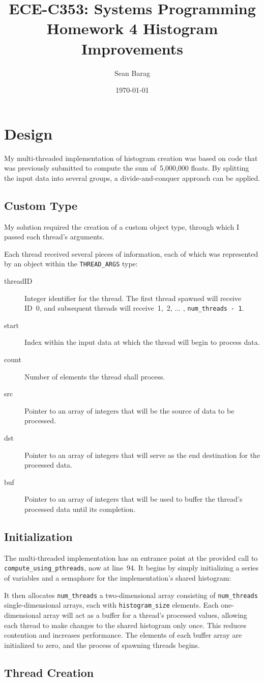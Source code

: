 \documentclass{article}
\title{ECE-C353: Systems Programming \\ Homework 4 Histogram Improvements}
\author{Sean Barag \\ \ttt{<sjb89@drexel.edu>}}
\date{\today}
\newcommand{\lst}[2]{
	\begin{center}
	\parbox{.6\textwidth}{
	}
	\end{center}
}
\newcommand{\ttt}[1]{\texttt{#1}}
\begin{document}
\maketitle
\section{Design}
My multi-threaded implementation of histogram creation was based on code that
was previously submitted to compute the sum of~5,000,000 floats.  By splitting
the input data into several groups, a divide-and-conquer approach can be
applied.

\subsection{Custom Type}
My solution required the creation of a custom object type, through which I passed each thread's arguments.
%
\lst{21}{31}
%
Each thread received several pieces of information, each of which was represented by an object within the \ttt{THREAD\_ARGS} type:

\begin{center}
\parbox{.85\textwidth}{
\begin{description}
	\item[threadID]{Integer identifier for the thread.  The first thread
	spawned will receive ID~0, and subsequent threads will
	receive~1,~2, $\ldots$ , \ttt{num\_threads - 1}.}
	\item[start]{Index within the input data at which the thread will begin to
	process data.}
	\item[count]{Number of elements the thread shall process.}
	\item[src]{Pointer to an array of integers that will be the source of data
	to be processed.}
	\item[dst]{Pointer to an array of integers that will serve as the end
	destination for the processed data.}
	\item[buf]{Pointer to an array of integers that will be used to buffer the
	thread's processed data until its completion.}
\end{description}
}
\end{center}

\subsection{Initialization}
The multi-threaded implementation has an entrance point at the provided call to
\ttt{compute\_using\_pthreads}, now at line~94.  It begins by simply
initializing a series of variables and a semaphore for the implementation's shared histogram:
%
\lst{134}{145}
%
It then allocates \ttt{num\_threads} a two-dimensional array consisting of
\ttt{num\_threads} single-dimensional arrays, each with
\ttt{histogram\_size} elements.  Each one-dimensional array will act as a
buffer for a thread's processed values, allowing each thread to make changes to
the shared histogram only once.  This reduces contention and increases
performance.  The elements of each buffer array are initialized to zero, and
the process of spawning threads begins.
%
\lst{147}{155}

\subsection{Thread Creation}
\end{document}
